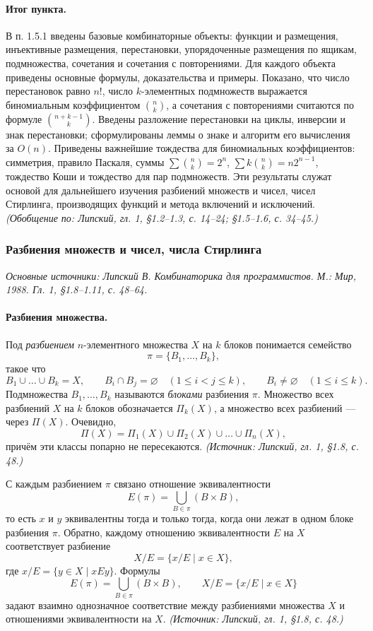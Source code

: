 \documentclass[a4paper,12pt]{article}
\begin{document}
\paragraph{Итог пункта.}
В п. 1.5.1 введены базовые комбинаторные объекты: функции и размещения, инъективные размещения, перестановки, упорядоченные размещения по ящикам, подмножества, сочетания и сочетания с повторениями. Для каждого объекта приведены основные формулы, доказательства и примеры. Показано, что число перестановок равно \(n!\), число \(k\)-элементных подмножеств выражается биномиальным коэффициентом \(\binom{n}{k}\), а сочетания с повторениями считаются по формуле \(\binom{n+k-1}{k}\). Введены разложение перестановки на циклы, инверсии и знак перестановки; сформулированы леммы о знаке и алгоритм его вычисления за \(O(n)\). Приведены важнейшие тождества для биномиальных коэффициентов: симметрия, правило Паскаля, суммы \(\sum \binom{n}{k}=2^n\), \(\sum k\binom{n}{k}=n2^{n-1}\), тождество Коши и тождество для пар подмножеств. Эти результаты служат основой для дальнейшего изучения разбиений множеств и чисел, чисел Стирлинга, производящих функций и метода включений и исключений.
\textit{(Обобщение по: Липский, гл. 1, §1.2--1.3, с. 14--24; §1.5--1.6, с. 34--45.)}

\subsubsection{Разбиения множеств и чисел, числа Стирлинга}

\noindent\textit{Основные источники: Липский В. Комбинаторика для программистов. М.: Мир, 1988. Гл. 1, §1.8--1.11, с. 48--64.}

\paragraph{Разбиения множества.}
Под \emph{разбиением} \(n\)-элементного множества \(X\) на \(k\) блоков понимается семейство
\[
\pi=\{B_1,\dots,B_k\},
\]
такое что
\[
B_1\cup\dots\cup B_k=X,\qquad
B_i\cap B_j=\varnothing\quad(1\le i<j\le k),\qquad
B_i\ne\varnothing\quad(1\le i\le k).
\]
Подмножества \(B_1,\dots,B_k\) называются \emph{блоками} разбиения \(\pi\). Множество всех разбиений \(X\) на \(k\) блоков обозначается \(\Pi_k(X)\), а множество всех разбиений — через \(\Pi(X)\). Очевидно,
\[
\Pi(X)=\Pi_1(X)\cup\Pi_2(X)\cup\dots\cup\Pi_n(X),
\]
причём эти классы попарно не пересекаются.
\textit{(Источник: Липский, гл. 1, §1.8, с. 48.)}

С каждым разбиением \(\pi\) связано отношение эквивалентности
\[
E(\pi)=\bigcup_{B\in\pi}(B\times B),
\]
то есть \(x\) и \(y\) эквивалентны тогда и только тогда, когда они лежат в одном блоке разбиения \(\pi\). Обратно, каждому отношению эквивалентности \(E\) на \(X\) соответствует разбиение
\[
X/E=\{x/E\mid x\in X\},
\]
где \(x/E=\{y\in X\mid xEy\}\). Формулы
\[
E(\pi)=\bigcup_{B\in\pi}(B\times B),
\qquad
X/E=\{x/E\mid x\in X\}
\]
задают взаимно однозначное соответствие между разбиениями множества \(X\) и отношениями эквивалентности на \(X\).
\textit{(Источник: Липский, гл. 1, §1.8, с. 48.)}
\end{document}
